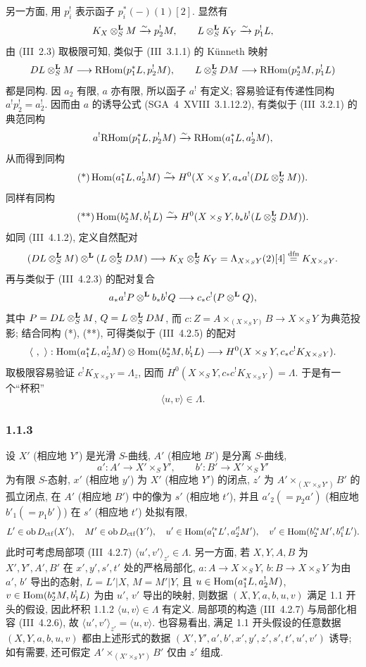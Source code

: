 另一方面, 用 $p_i^!$ 表示函子 $p_i^*(-)(1)[2]$. 显然有
\[
K_X\otimes_S^{\mathbf L}M\xrightarrow{\sim}p_2^!M,
\qquad
L\otimes_S^{\mathbf L}K_Y\xrightarrow{\sim}p_1^!L,
\]
由 (III~2.3) 取极限可知, 类似于 (III~3.1.1) 的 Künneth 映射
\[
DL\otimes_S^{\mathbf L}M\longrightarrow \mathrm{RHom}(p_1^*L,p_2^!M),
\qquad
L\otimes_S^{\mathbf L}DM\longrightarrow \mathrm{RHom}(p_2^*M,p_1^!L)
\]
都是同构. 因 $a_2$ 有限, $a$ 亦有限, 所以函子 $a^!$ 有定义; 容易验证有传递性同构 $a^!p_2^!=a_2^!$. 因而由 $a$ 的诱导公式 (SGA~4~XVIII~3.1.12.2), 有类似于 (III~3.2.1) 的典范同构
\[
a^!\mathrm{RHom}(p_1^*L,p_2^!M)\xrightarrow{\sim}\mathrm{RHom}(a_1^*L,a_2^!M),
\]
从而得到同构
\begin{equation}\tag{*}
\operatorname{Hom}(a_1^*L,a_2^!M)\xrightarrow{\sim}H^0(X\times_S Y,a_*a^!(DL\otimes_S^{\mathbf L}M)).
\end{equation}
同样有同构
\begin{equation}\tag{**}
\operatorname{Hom}(b_2^*M,b_1^!L)\xrightarrow{\sim}H^0(X\times_S Y,b_*b^!(L\otimes_S^{\mathbf L}DM)).
\end{equation}
如同 (III~4.1.2), 定义自然配对
\[
(DL\otimes_S^{\mathbf L}M)\otimes^{\mathbf L}(L\otimes_S^{\mathbf L}DM)
\longrightarrow K_X\otimes_S^{\mathbf L}K_Y=\Lambda_{X\times_S Y}(2)[4]\stackrel{\mathrm{dfn}}{=}K_{X\times_S Y}.
\]
再与类似于 (III~4.2.3) 的配对复合
\[
a_*a^!P\otimes^{\mathbf L} b_*b^!Q\longrightarrow c_*c^!(P\otimes^{\mathbf L}Q),
\]
其中 $P=DL\otimes_S^{\mathbf L}M$, $Q=L\otimes_S^{\mathbf L}DM$, 而 $c:Z=A\times_{(X\times_S Y)}B\to X\times_S Y$ 为典范投影; 结合同构 (*), (**), 可得类似于 (III~4.2.5) 的配对
\[
\langle\ ,\ \rangle:\Hom(a_1^*L,a_2^!M)\otimes\Hom(b_2^*M,b_1^!L)
\longrightarrow H^0(X\times_S Y,c_*c^!K_{X\times_S Y}).
\]
取极限容易验证 $c^!K_{X\times_S Y}=\Lambda_z$, 因而 $H^0(X\times_S Y,c_*c^!K_{X\times_S Y})=\Lambda$. 于是有一个``杯积''
\begin{equation}\tag{1.1.2}
\langle u,v\rangle\in\Lambda.
\end{equation}

\subsubsection*{1.1.3}
设 $X'$ (相应地 $Y'$) 是光滑 $S$-曲线, $A'$ (相应地 $B'$) 是分离 $S$-曲线,
\[
a':A'\longrightarrow X'\times_S Y',
\qquad
b':B'\longrightarrow X'\times_S Y'
\]
为有限 $S$-态射, $x'$ (相应地 $y'$) 为 $X'$ (相应地 $Y'$) 的闭点, $z'$ 为 $A'\times_{(X'\times_S Y')}B'$ 的孤立闭点, 在 $A'$ (相应地 $B'$) 中的像为 $s'$ (相应地 $t'$), 并且 $a'_2(=p_2a')$ (相应地 $b'_1(=p_1b')$) 在 $s'$ (相应地 $t'$) 处拟有限,
\[
L'\in\operatorname{ob} D_{\mathrm{ctf}}(X'),\quad M'\in\operatorname{ob} D_{\mathrm{ctf}}(Y'),\quad
u'\in\operatorname{Hom}(a_1'^*L',a_2'^!M'),\quad v'\in\operatorname{Hom}(b_2'^*M',b_1'^!L').
\]
此时可考虑局部项 (III~4.2.7) $\langle u',v'\rangle_{z'}\in\Lambda$. 另一方面, 若 $X,Y,A,B$ 为 $X',Y',A',B'$ 在 $x',y',s',t'$ 处的严格局部化, $a:A\to X\times_S Y$, $b:B\to X\times_SY$ 为由 $a'$, $b'$ 导出的态射, $L=L'|X$, $M=M'|Y$, 且 $u\in\operatorname{Hom}(a_1^*L,a_2^!M)$, $v\in\operatorname{Hom}(b_2^*M,b_1^!L)$ 为由 $u'$, $v'$ 导出的映射, 则数据 $(X,Y,a,b,u,v)$ 满足 1.1 开头的假设, 因此杯积 1.1.2 $\langle u,v\rangle\in\Lambda$ 有定义. 局部项的构造 (III~4.2.7) 与局部化相容 (III~4.2.6), 故 $\langle u',v'\rangle_{z'}=\langle u,v\rangle$. 也容易看出, 满足 1.1 开头假设的任意数据 $(X,Y,a,b,u,v)$ 都由上述形式的数据 $(X',Y',a',b',x',y',z',s',t',u',v')$ 诱导; 如有需要, 还可假定 $A'\times_{(X'\times_S Y')}B'$ 仅由 $z'$ 组成.

